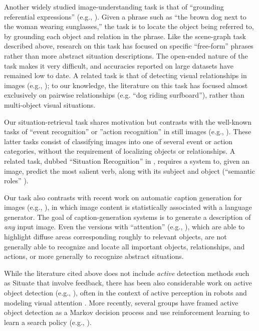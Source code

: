 \documentclass[conference]{IEEEtran}
\begin{document}
Another widely studied image-understanding task is that of ``grounding
referential expressions'' (e.g.,
\cite{Mao2016,Nagaraja2016,Rohrbach2016}).  Given a phrase such as
``the brown dog next to the woman wearing sunglasses,'' the task is to
locate the object being referred to, by grounding each object and
relation in the phrase.   Like the scene-graph task described above, research on this task
has focused on specific ``free-form'' phrases rather than more
abstract situation descriptions. The open-ended nature of the task
makes it very difficult, and accuracies reported on large datasets
have remained low to date.  A related task is that of detecting visual
relationships in images (e.g., \cite{Lu2016}); to our knowledge, the
literature on this task has focused almost exclusively on pairwise
relationships (e.g. ``dog riding surfboard''), rather than
multi-object visual situations.

Our situation-retrieval task shares motivation but contrasts with the
well-known tasks of ``event recognition'' or ''action recognition'' in
still images (e.g., \cite{Guo2014,Li2007,Wang2015}).  These latter
tasks consist of classifying images into one of several event or
action categories, without the requirement of localizing objects or
relationships.  A related task, dubbed ``Situation Recognition'' in
\cite{Yatskar2016}, requires a system to, given an image, predict the
most salient verb, along with its subject and object (``semantic
roles'' \cite{Gupta2015}).

Our task also contrasts with recent work on automatic caption
generation for images (e.g., \cite{Vinyals2015}), in which image
content is statistically associated with a language generator.  The
goal of caption-generation systems is to generate a description of
{\it any} input image.  Even the versions with ``attention'' (e.g., \cite{Xu2015}),
which are able to highlight diffuse areas corresponding roughly to
relevant objects, are not generally able to recognize and locate all important
objects, relationships, and actions, or more generally to recognize
abstract situations.  

While the literature cited above does not include {\it active}
detection methods such as Situate that involve feedback, there has
been also considerable work on active object detection (e.g.,
\cite{Alexe2012,Gonzalez-Garcia2015}), often in the context of active
perception in robots \cite{Ballard1991} and modeling visual attention
\cite{Ba2014,Mnih2014}.  More recently, several groups have
framed active object detection as a Markov decision process and use
reinforcement learning to learn a search policy (e.g., \cite{Caicedo2015}).
\end{document}
